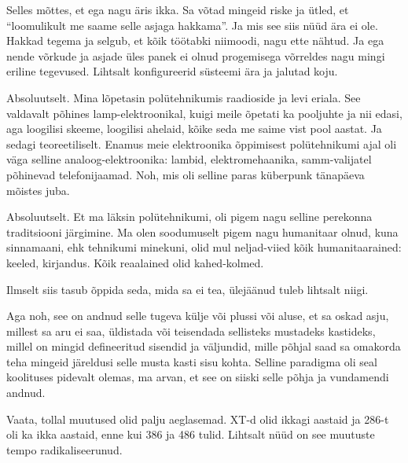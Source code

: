 Selles mõttes, et ega nagu äris ikka. Sa võtad mingeid riske ja ütled, et 
\enquote{loomulikult me saame selle asjaga hakkama}. Ja mis see siis nüüd ära 
ei ole. Hakkad tegema ja  selgub, et  kõik töötabki niimoodi, nagu ette nähtud.
Ja ega  nende võrkude ja asjade üles panek ei olnud  progemisega võrreldes nagu 
mingi eriline tegevused. Lihtsalt konfigureerid süsteemi ära ja jalutad koju.


Absoluutselt. Mina lõpetasin polütehnikumis 
raadioside ja levi eriala. See valdavalt põhines lamp-elektroonikal, kuigi 
meile õpetati ka pooljuhte ja nii edasi, aga loogilisi skeeme, loogilisi 
ahelaid, kõike seda me saime vist pool aastat. Ja sedagi  
teoreetiliselt. Enamus  meie  elektroonika õppimisest polütehnikumi ajal oli 
väga selline analoog-elektroonika: lambid, elektromehaanika, samm-valijatel 
põhinevad telefonijaamad. Noh, mis oli selline paras küberpunk tänapäeva 
mõistes juba. 


Absoluutselt. Et ma läksin polütehnikumi, oli pigem nagu selline perekonna 
traditsiooni järgimine. Ma olen soodumuselt pigem nagu humanitaar olnud, kuna 
sinnamaani, ehk tehnikumi minekuni, olid mul neljad-viied kõik humanitaarained: 
keeled, kirjandus. Kõik reaalained olid kahed-kolmed.

Ilmselt siis tasub õppida seda, mida sa ei tea, ülejäänud tuleb lihtsalt niigi. 

Aga noh, see on andnud  selle tugeva külje või plussi või aluse, et sa oskad 
asju, millest sa aru ei saa, üldistada või teisendada sellisteks mustadeks 
kastideks, millel on mingid defineeritud sisendid ja väljundid, mille põhjal 
saad sa omakorda teha mingeid järeldusi selle musta kasti sisu kohta. 
Selline paradigma oli seal koolituses pidevalt olemas, ma arvan, et see on 
siiski selle põhja ja vundamendi andnud.
                 

Vaata, tollal muutused olid palju aeglasemad. XT-d olid ikkagi  aastaid 
ja 286-t oli ka ikka aastaid, enne kui 386 ja 486 tulid. Lihtsalt nüüd on see 
muutuste tempo  radikaliseerunud.
                 
